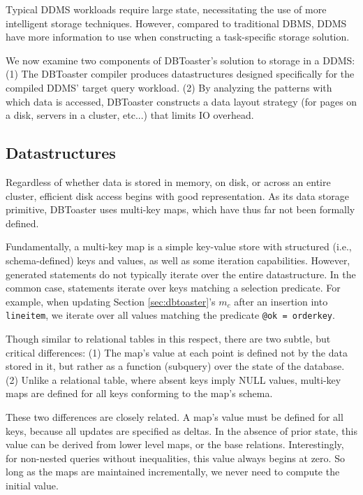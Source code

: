 Typical DDMS workloads require large state, necessitating the use of more intelligent storage techniques.  However, compared to traditional DBMS, DDMS have more information to use when constructing a task-specific storage solution.  

We now examine two components of DBToaster's solution to storage in a DDMS: (1) The DBToaster compiler produces datastructures designed specifically for the compiled DDMS' target query workload. (2) By analyzing the patterns with which data is accessed, DBToaster constructs a data layout strategy (for pages on a disk, servers in a cluster, etc...) that limits IO overhead.

\subsection{Datastructures}
Regardless of whether data is stored in memory, on disk, or across an entire cluster, efficient disk access begins with good representation.  As its data storage primitive, DBToaster uses multi-key maps, which have thus far not been formally defined.

Fundamentally, a multi-key map is a simple key-value store with structured (i.e., schema-defined) keys and values, as well as some iteration capabilities.  However, generated statements do not typically iterate over the entire datastructure.  In the common case, statements iterate over keys matching a selection predicate.  For example, when updating Section \ref{sec:dbtoaster}'s $m_c$ after an insertion into \texttt{lineitem}, we iterate over all values matching the predicate \texttt{@ok = orderkey}.  

Though similar to relational tables in this respect, there are two subtle, but critical differences: (1) The map's value at each point is defined not by the data stored in it, but rather as a function (subquery) over the state of the database.  (2) Unlike a relational table, where absent keys imply NULL values, multi-key maps are defined for all keys conforming to the map's schema.  

These two differences are closely related.  A map's value must be defined for all keys, because all updates are specified as deltas.  In the absence of prior state, this value can be derived from lower level maps, or the base relations.  Interestingly, for non-nested queries without inequalities, this value always begins at zero.  So long as the maps are maintained incrementally, we never need to compute the initial value.

